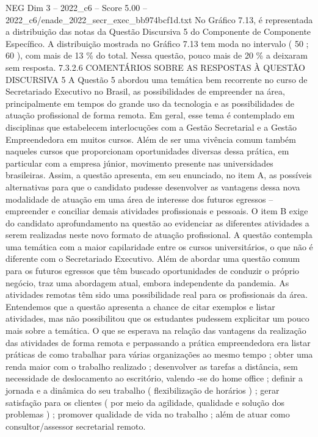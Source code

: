 \begin{textsample}{NEG Dim 3 – 2022\_c6 – Score 5.00 – 2022\_c6/enade\_2022\_secr\_exec\_bb974bcf1d.txt}
No Gráfico 7.13, é representada a distribuição das notas da Questão Discursiva 5 do Componente de Componente Específico.
A distribuição mostrada no Gráfico 7.13 tem moda no intervalo ( 50 ; 60 ), com mais de 13 \% do total.
Nessa questão, pouco mais de 20 \% a deixaram sem resposta. 7.3.2.6 COMENTÁRIOS SOBRE AS RESPOSTAS À QUESTÃO DISCURSIVA 5 A Questão 5 abordou uma temática bem recorrente no curso de Secretariado Executivo no Brasil, as possibilidades de empreender na área, principalmente em tempos do grande uso da tecnologia e as possibilidades de atuação profissional de forma remota.
Em geral, esse tema é contemplado em disciplinas que estabelecem interlocuções com a Gestão Secretarial e a Gestão Empreendedora em muitos cursos.
Além de ser uma vivência comum também naqueles cursos que proporcionam oportunidades diversas dessa prática, em particular com a empresa júnior, movimento presente nas universidades brasileiras.
Assim, a questão apresenta, em seu enunciado, no item A, as possíveis alternativas para que o candidato pudesse desenvolver as vantagens dessa nova modalidade de atuação em uma área de interesse dos futuros egressos – empreender e conciliar demais atividades profissionais e pessoais.
O item B exige do candidato aprofundamento na questão ao evidenciar as diferentes atividades a serem realizadas neste novo formato de atuação profissional.
A questão contempla uma temática com a maior capilaridade entre os cursos universitários, o que não é diferente com o Secretariado Executivo.
Além de abordar uma questão comum para os futuros egressos que têm buscado oportunidades de conduzir o próprio negócio, traz uma abordagem atual, embora independente da pandemia.
As atividades remotas têm sido uma possibilidade real para os profissionais da área.
Entendemos que a questão apresenta a chance de citar exemplos e listar atividades, mas não possibilitou que os estudantes pudessem explicitar um pouco mais sobre a temática.
O que se esperava na relação das vantagens da realização das atividades de forma remota e perpassando a prática empreendedora era listar práticas de como trabalhar para várias organizações ao mesmo tempo ; obter uma renda maior com o trabalho realizado ; desenvolver as tarefas a distância, sem necessidade de deslocamento ao escritório, valendo -se do home office ; definir a jornada e a dinâmica do seu trabalho ( flexibilização de horários ) ; gerar satisfação para os clientes ( por meio da agilidade, qualidade e solução dos problemas ) ; promover qualidade de vida no trabalho ; além de atuar como consultor/assessor secretarial remoto.

\end{textsample}
